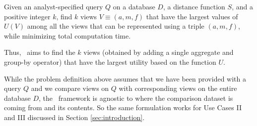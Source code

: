 \begin{problem}
\vspace{-5pt}
Given an analyst-specified query $Q$ on a database $D$, a distance function $S$,
and a positive integer $k$, find $k$ views $V \equiv (a, m, f)$ that
have the largest values of $U(V)$ among all the views that can be represented
using a triple $(a, m, f)$, while minimizing total computation time.
\vspace{-5pt}
\end{problem}
Thus, \VizRecDB\ aims to find the $k$ views (obtained by adding a single aggregate
 and group-by operator) that have the largest utility based on the function $U$.

While the problem definition above assumes that we have been provided with a
query $Q$ and we compare views on $Q$ with corresponding views on the entire
database $D$, the \VizRecDB\ framework is agnostic to where the comparison
dataset is coming from and its contents. So the same formulation works for Use
Cases II and III discussed in Section \ref{sec:introduction}. 




